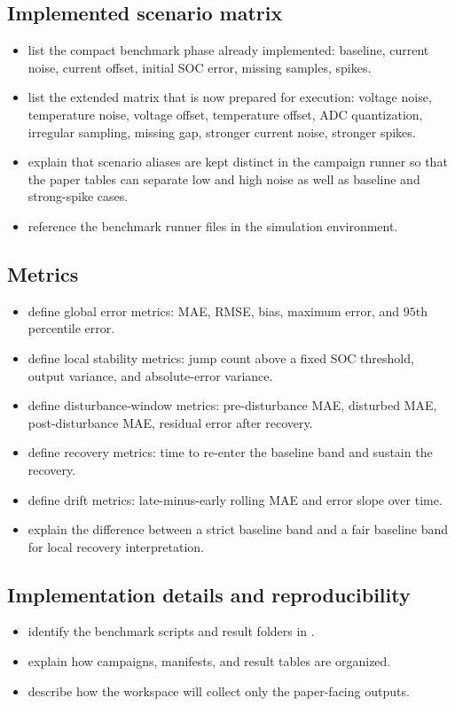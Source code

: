 \documentclass[review,nopreprintline]{elsarticle}
\newcommand{\code}[1]{\path{#1}}
\begin{document}
\subsection{Implemented scenario matrix}
\begin{itemize}[leftmargin=*]
    \item list the compact benchmark phase already implemented: baseline, current noise, current offset, initial SOC error, missing samples, spikes.
    \item list the extended matrix that is now prepared for execution: voltage noise, temperature noise, voltage offset, temperature offset, ADC quantization, irregular sampling, missing gap, stronger current noise, stronger spikes.
    \item explain that scenario aliases are kept distinct in the campaign runner so that the paper tables can separate low and high noise as well as baseline and strong-spike cases.
    \item reference the benchmark runner files in the simulation environment.
\end{itemize}

\subsection{Metrics}
\begin{itemize}[leftmargin=*]
    \item define global error metrics: MAE, RMSE, bias, maximum error, and $95$th percentile error.
    \item define local stability metrics: jump count above a fixed SOC threshold, output variance, and absolute-error variance.
    \item define disturbance-window metrics: pre-disturbance MAE, disturbed MAE, post-disturbance MAE, residual error after recovery.
    \item define recovery metrics: time to re-enter the baseline band and sustain the recovery.
    \item define drift metrics: late-minus-early rolling MAE and error slope over time.
    \item explain the difference between a strict baseline band and a fair baseline band for local recovery interpretation.
\end{itemize}

\subsection{Implementation details and reproducibility}
\begin{itemize}[leftmargin=*]
    \item identify the benchmark scripts and result folders in \code{4\_simulation\_environment}.
    \item explain how campaigns, manifests, and result tables are organized.
    \item describe how the \code{results/} workspace will collect only the paper-facing outputs.
\end{itemize}
\end{document}
